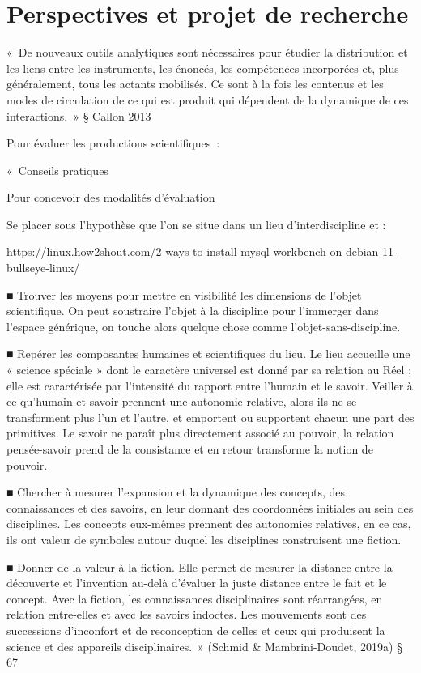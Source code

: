 \documentclass[
  letterpaper,
  DIV=11,
  numbers=noendperiod]{scrreprt}
\begin{document}
\part{Perspectives et projet de recherche}

«~De nouveaux outils analytiques sont nécessaires pour étudier la
distribution et les liens entre les instruments, les énoncés, les
compétences incorporées et, plus généralement, tous les actants
mobilisés. Ce sont à la fois les contenus et les modes de circulation de
ce qui est produit qui dépendent de la dynamique de ces interactions.~»
§ Callon 2013

Pour évaluer les productions scientifiques~:

«~Conseils pratiques

Pour concevoir des modalités d'évaluation

Se placer sous l'hypothèse que l'on se situe dans un lieu
d'interdiscipline et :

https://linux.how2shout.com/2-ways-to-install-mysql-workbench-on-debian-11-bullseye-linux/

■ Trouver les moyens pour mettre en visibilité les dimensions de l'objet
scientifique. On peut soustraire l'objet à la discipline pour l'immerger
dans l'espace générique, on touche alors quelque chose comme
l'objet-sans-discipline.

■ Repérer les composantes humaines et scientifiques du lieu. Le lieu
accueille une « science spéciale » dont le caractère universel est donné
par sa relation au Réel ; elle est caractérisée par l'intensité du
rapport entre l'humain et le savoir. Veiller à ce qu'humain et savoir
prennent une autonomie relative, alors ils ne se transforment plus l'un
et l'autre, et emportent ou supportent chacun une part des primitives.
Le savoir ne paraît plus directement associé au pouvoir, la relation
pensée-savoir prend de la consistance et en retour transforme la notion
de pouvoir.

■ Chercher à mesurer l'expansion et la dynamique des concepts, des
connaissances et des savoirs, en leur donnant des coordonnées initiales
au sein des disciplines. Les concepts eux-mêmes prennent des autonomies
relatives, en ce cas, ils ont valeur de symboles autour duquel les
disciplines construisent une fiction.

■ Donner de la valeur à la fiction. Elle permet de mesurer la distance
entre la découverte et l'invention au-delà d'évaluer la juste distance
entre le fait et le concept. Avec la fiction, les connaissances
disciplinaires sont réarrangées, en relation entre-elles et avec les
savoirs indoctes. Les mouvements sont des successions d'inconfort et de
reconception de celles et ceux qui produisent la science et des
appareils disciplinaires.~» (Schmid \& Mambrini-Doudet, 2019a) § 67
\end{document}
